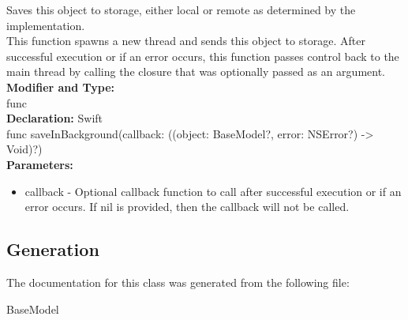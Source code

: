 Saves this object to storage, either local or remote as determined by the implementation.\\

This function spawns a new thread and sends this object to storage. After successful execution or if an error occurs, this function passes control back to the main thread by calling the closure that was optionally passed as an argument.\\

\textbf{Modifier and Type:}\\
\tab func \\

\textbf{Declaration:}
\tab 
Swift\\

func saveInBackground(callback: ((object: BaseModel?, error: NSError?) -> Void)?)\\

\textbf{Parameters:}\\
\begin{itemize}
\item callback - Optional callback function to call after successful execution or if an error occurs. If nil is provided, then the callback will not be called.
\end{itemize}

\subsection{Generation}
The documentation for this class was generated from the following file\-:
\begin{DoxyCompactItemize}
\item BaseModel
\end{DoxyCompactItemize} 









